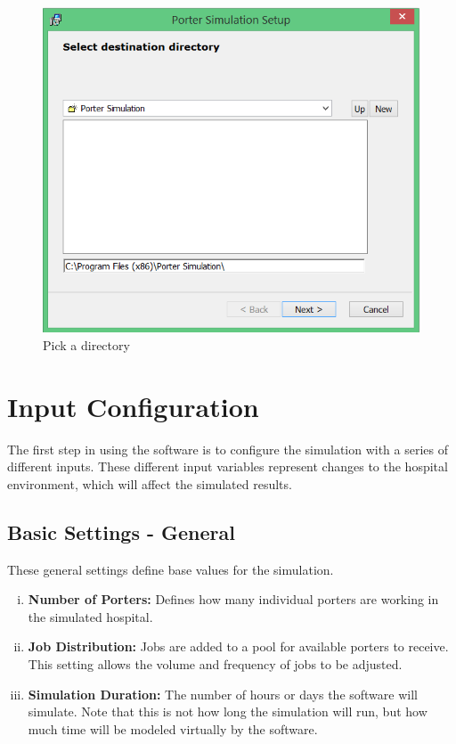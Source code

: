 \documentclass[paper=letter, fontsize=10pt]{scrartcl}
\numberwithin{equation}{section}		%
\numberwithin{figure}{section}			%
\numberwithin{table}{section}				%
\begin{document}
\begin{figure}[!htbp]
	\begin{center}
		\includegraphics[width=1\columnwidth, height=0.5\textheight, keepaspectratio]{Installer.png}
		\caption{Pick a directory}
	\end{center}
\end{figure}

\section{Input Configuration}
The first step in using the software is to configure the simulation with a series of different inputs. These different input variables represent changes to the hospital environment, which will affect the simulated results. 
	\subsection{Basic Settings - General}
	These general settings define base values for the simulation.
	\begin{enumerate}[(i)]
		\item \textbf{Number of Porters:} Defines how many individual porters are working in the simulated hospital.
		\item \textbf{Job Distribution:} Jobs are added to a pool for available porters to receive. This setting allows the volume and frequency of jobs to be adjusted.
		\item \textbf{Simulation Duration:} The number of hours or days the software will simulate. Note that this is not how long the simulation will run, but how much time will be modeled virtually by the software. 
	\end{enumerate}
	
\end{document}
